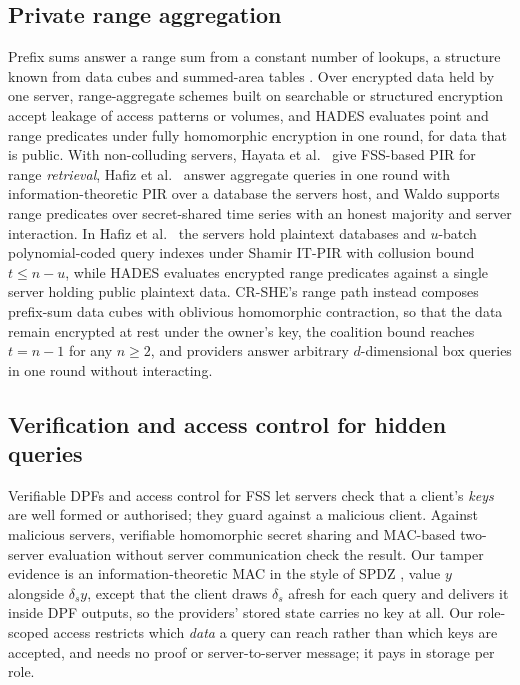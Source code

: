 \documentclass[a4paper,fleqn]{cas-sc}
\begin{document}
\subsection{Private range aggregation}
Prefix sums answer a range sum from a constant number of lookups, a structure
known from data cubes \citep{ho1997range} and summed-area tables
\citep{crow1984summed}. Over encrypted data held by one server, range-aggregate
schemes built on searchable or structured encryption
\citep{demertzis2018practical,espiritu2022arq} accept leakage of access
patterns or volumes, and HADES \citep{liu2025hades} evaluates point and range
predicates under fully homomorphic encryption in one round, for data that is
public. With non-colluding servers, Hayata et al.\ \citep{hayata2020private}
give FSS-based PIR for range \emph{retrieval}, Hafiz et
al.\ \citep{hafiz2024private} answer aggregate queries in one round with
information-theoretic PIR over a database the servers host, and Waldo
\citep{waldo} supports range predicates over secret-shared time series with an
honest majority and server interaction. In Hafiz et al.\ \citep{hafiz2024private} the servers hold plaintext
databases and $u$-batch polynomial-coded query indexes under Shamir IT-PIR
with collusion bound $t \le n - u$, while HADES \citep{liu2025hades} evaluates
encrypted range predicates against a single server holding public plaintext
data. CR-SHE's range path instead composes prefix-sum data cubes with
oblivious homomorphic contraction, so that the data remain encrypted at rest
under the owner's key, the coalition bound reaches $t=n-1$ for any $n\ge 2$,
and providers answer arbitrary $d$-dimensional box queries in one round without
interacting.

\subsection{Verification and access control for hidden queries}
Verifiable DPFs \citep{decastro2022lightweight} and access control for FSS
\citep{pacl,ji2023finegrained} let servers check that a client's \emph{keys}
are well formed or authorised; they guard against a malicious client. Against
malicious servers, verifiable homomorphic secret sharing
\citep{choudhuri2024vehss} and MAC-based two-server evaluation without server
communication \citep{li2026silent} check the result. Our tamper evidence is an
information-theoretic MAC in the style of SPDZ \citep{damgard2012spdz}, value
$y$ alongside $\delta_s y$, except that the client draws $\delta_s$ afresh for
each query and delivers it inside DPF outputs, so the providers' stored state
carries no key at all. Our role-scoped access restricts which \emph{data} a
query can reach rather than which keys are accepted, and needs no proof or
server-to-server message; it pays in storage per role.
\end{document}
